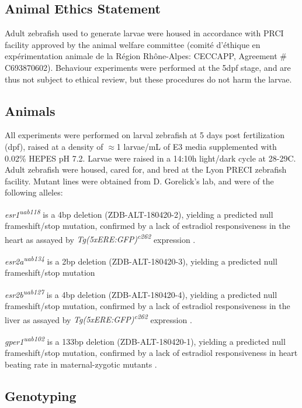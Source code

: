 \documentclass[9pt,lineno]{RandlettLab_elife}
\begin{document}
\subsection{Animal Ethics Statement}

Adult zebrafish used to generate larvae were housed in accordance with PRCI facility approved by the animal welfare committee (comité d’éthique en expérimentation animale de la Région Rhône-Alpes: CECCAPP, Agreement \# C693870602). 
Behaviour experiments were performed at the 5dpf stage, and are thus not subject to ethical review, but these procedures do not harm the larvae. 

\subsection{Animals}

All experiments were performed on larval zebrafish at 5 days post fertilization (dpf), raised at a density of $\approx$1 larvae/mL of E3 media supplemented with 0.02\% HEPES pH 7.2. 
Larvae were raised in a 14:10h light/dark cycle at 28-29\degree{}C. 
Adult zebrafish were housed, cared for, and bred at the Lyon PRECI zebrafish facility. 
Mutant lines were obtained from D. Gorelick's lab, and were of the following alleles: 

\emph{esr1\textsuperscript{uab118}} is a 4bp deletion (ZDB-ALT-180420-2), yielding a predicted null frameshift/stop mutation, confirmed by a lack of estradiol responsiveness in the heart as assayed by \emph{Tg(5xERE:GFP)\textsuperscript{c262}} expression \citep{Romano2017-ep}. 

\emph{esr2a\textsuperscript{uab134}} is a 2bp deletion (ZDB-ALT-180420-3), yielding a predicted null frameshift/stop mutation \citep{Romano2017-ep}

\emph{esr2b\textsuperscript{uab127}} is a 4bp deletion (ZDB-ALT-180420-4), yielding a predicted null frameshift/stop mutation, confirmed by a lack of estradiol responsiveness in the liver as assayed by \emph{Tg(5xERE:GFP)\textsuperscript{c262}} expression \citep{Romano2017-ep}. 

\emph{gper1\textsuperscript{uab102}} is a 133bp deletion (ZDB-ALT-180420-1), yielding a predicted null frameshift/stop mutation, confirmed by a lack of estradiol responsiveness in heart beating rate in maternal-zygotic mutants \citep{Romano2017-ep}.

\subsection{Genotyping}
\end{document}
